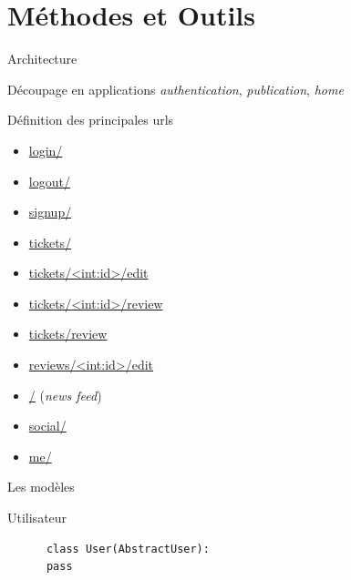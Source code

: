 \section{Méthodes et Outils}

\begin{frame}{Architecture}
  \begin{block}{Découpage en applications}
    {\color{darkred}\textit{authentication}}, 
    {\color{darkblue}\textit{publication}}, 
    {\color{darkgreen}\textit{home}}
  \end{block}
  
  \begin{block}{Définition des principales urls}
    \tiny
    \begin{itemize}
    \item {\color{darkred} \url{login/}}
    \item {\color{darkred} \url{logout/}}
    \item {\color{darkred} \url{signup/}}
    \item {\color{darkblue} \url{tickets/}}
    \item {\color{darkblue} \url{tickets/<int:id>/edit}}
    \item {\color{darkblue} \url{tickets/<int:id>/review}}
    \item {\color{darkblue} \url{tickets/review}}
    \item {\color{darkblue} \url{reviews/<int:id>/edit}}

    \item {\color{darkgreen} \url{/}} (\textit{news feed})
    \item {\color{darkgreen} \url{social/}}
    \item {\color{darkgreen} \url{me/}}
    \end{itemize}
  \end{block}
\end{frame}

\begin{frame}[fragile]{Les modèles}
  \begin{block}{Utilisateur}
    \begin{lstlisting}
      class User(AbstractUser):
      pass
    \end{lstlisting}    
  \end{block}
\end{frame}

